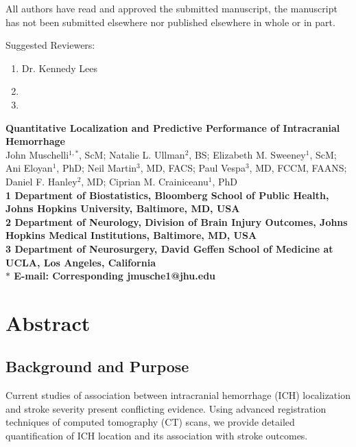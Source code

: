 \documentclass[10pt]{article}\usepackage[]{graphicx}\usepackage[]{color}
\date{}
\begin{document}
All authors have read and approved the submitted manuscript, the manuscript has not been submitted elsewhere nor published elsewhere in whole or in part.

Suggested Reviewers:
\begin{enumerate}
\item Dr. Kennedy Lees
\item 
\item 
\end{enumerate}

\newpage 

\begin{flushleft}
{\Large
\textbf{Quantitative Localization and Predictive Performance of Intracranial Hemorrhage}
}
\\
John Muschelli$^{1,\ast}$, ScM;
Natalie L. Ullman$^{2}$, BS;
Elizabeth M. Sweeney$^{1}$, ScM;
Ani Eloyan$^{1}$, PhD; 
Neil Martin$^{3}$, MD, FACS;
Paul Vespa$^{3}$, MD, FCCM, FAANS;
Daniel F. Hanley$^{2}$, MD;
Ciprian M. Crainiceanu$^{1}$, PhD
\\
\bf{1} Department of Biostatistics, Bloomberg School of Public Health, Johns Hopkins University, Baltimore, MD, USA
\\
\bf{2} Department of Neurology, Division of Brain Injury Outcomes,  Johns Hopkins Medical Institutions, Baltimore, MD, USA
\\
\bf{3} Department of Neurosurgery, David Geffen School of Medicine at UCLA, Los Angeles, California
\\
$\ast$ E-mail: Corresponding jmusche1@jhu.edu
\end{flushleft}



\newpage 



















\section*{Abstract}


\subsection*{Background and Purpose}
Current studies of association between intracranial hemorrhage (ICH) localization and stroke severity present conflicting evidence. Using advanced registration techniques of computed tomography (CT) scans, we provide detailed quantification of ICH location and its association with stroke outcomes.
\end{document}
